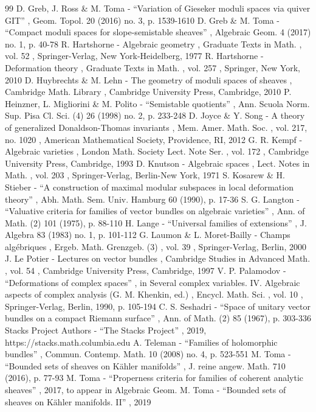 \documentclass[11pt]{article}
\begin{document}
\begin{thebibliography}{99}
 D. Greb, J. Ross \& M. Toma - “Variation of Gieseker moduli spaces via quiver GIT” , Geom. Topol. 20 (2016) no. 3, p. 1539-1610
 D. Greb \& M. Toma - “Compact moduli spaces for slope-semistable sheaves” , Algebraic Geom. 4 (2017) no. 1, p. 40-78
 R. Hartshorne - Algebraic geometry , Graduate Texts in Math. , vol. 52 , Springer-Verlag, New York-Heidelberg, 1977
 R. Hartshorne - Deformation theory , Graduate Texts in Math. , vol. 257 , Springer, New York, 2010
 D. Huybrechts \& M. Lehn - The geometry of moduli spaces of sheaves , Cambridge Math. Library , Cambridge University Press, Cambridge, 2010
 P. Heinzner, L. Migliorini \& M. Polito - “Semistable quotients” , Ann. Scuola Norm. Sup. Pisa Cl. Sci. (4) 26 (1998) no. 2, p. 233-248
 D. Joyce \& Y. Song - A theory of generalized Donaldson-Thomas invariants , Mem. Amer. Math. Soc. , vol. 217, no. 1020 , American Mathematical Society, Providence, RI, 2012
 G. R. Kempf - Algebraic varieties , London Math. Society Lect. Note Ser. , vol. 172 , Cambridge University Press, Cambridge, 1993
 D. Knutson - Algebraic spaces , Lect. Notes in Math. , vol. 203 , Springer-Verlag, Berlin-New York, 1971
 S. Kosarew \& H. Stieber - “A construction of maximal modular subspaces in local deformation theory” , Abh. Math. Sem. Univ. Hamburg 60 (1990), p. 17-36
 S. G. Langton - “Valuative criteria for families of vector bundles on algebraic varieties” , Ann. of Math. (2) 101 (1975), p. 88-110
 H. Lange - “Universal families of extensions” , J. Algebra 83 (1983) no. 1, p. 101-112
 G. Laumon \& L. Moret-Bailly - Champs algébriques , Ergeb. Math. Grenzgeb. (3) , vol. 39 , Springer-Verlag, Berlin, 2000
 J. Le Potier - Lectures on vector bundles , Cambridge Studies in Advanced Math. , vol. 54 , Cambridge University Press, Cambridge, 1997
 V. P. Palamodov - “Deformations of complex spaces” , in Several complex variables. IV. Algebraic aspects of complex analysis (G. M. Khenkin, ed.) , Encycl. Math. Sci. , vol. 10 , Springer-Verlag, Berlin, 1990, p. 105-194
 C. S. Seshadri - “Space of unitary vector bundles on a compact Riemann surface” , Ann. of Math. (2) 85 (1967), p. 303-336
 Stacks Project Authors - “The Stacks Project” , 2019, https://stacks.math.columbia.edu
 A. Teleman - “Families of holomorphic bundles” , Commun. Contemp. Math. 10 (2008) no. 4, p. 523-551
 M. Toma - “Bounded sets of sheaves on Kähler manifolds” , J. reine angew. Math. 710 (2016), p. 77-93
 M. Toma - “Properness criteria for families of coherent analytic sheaves” , 2017, to appear in Algebraic Geom.
 M. Toma - “Bounded sets of sheaves on Kähler manifolds. II” , 2019
\end{thebibliography}
\end{document}
